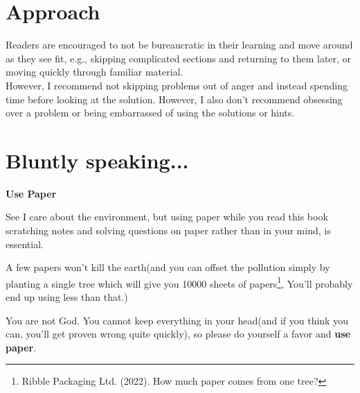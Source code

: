 \section{Approach}
Readers are encouraged to not be bureaucratic in their learning and move around as they see fit, e.g., skipping complicated sections and returning to them later, or moving quickly through familiar material.\\
However, I recommend not skipping problems out of anger and instead spending time before looking at the solution. However, I also don't recommend obsessing over a problem or being embarrassed of using the solutions or hints. \\
\section{Bluntly speaking...}
\begin{mdframed}
    \textbf{Use Paper}
\end{mdframed}
See I care about the environment, but using paper while you read this book scratching notes
 and solving questions on paper rather than in your mind, is essential. \par
  A few papers won't kill the earth(and you can offset the pollution simply by planting a single tree which will give you 10000 sheets of 
 papers\footnote{Ribble Packaging Ltd. (2022). How much paper comes from one tree?}, You'll probably end up using less than that.)\par
You are not God. You cannot keep everything in your head(and if you think you can, you'll get proven wrong quite quickly), 
so please do yourself a favor and \textbf{use paper}.
